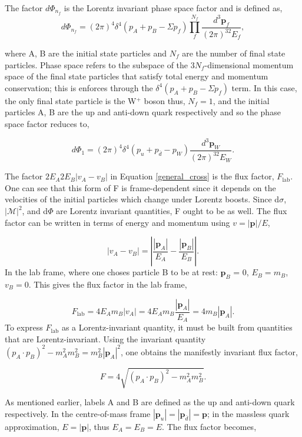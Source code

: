 \documentclass[a4paper,11pt]{article}
\begin{document}
The factor $d\Phi_{n_f}$ is the Lorentz invariant phase space factor and is defined as,
$$d\Phi_{n_f} = (2\pi)^4 \delta^4(p_A +p_B - \Sigma p_f) \prod_{f}^{N_f}\frac{d^3\boldsymbol{p}_f}{(2\pi)^32E_f},$$

where A, B are the initial state particles and $N_f$ are the number of final state particles. Phase space refers to the subspace of the $3N_f$-dimensional momentum space of the final state particles that satisfy total energy and momentum conservation; this is enforces through the $\delta^4(p_A +p_B - \Sigma p_f)$ term. In this case, the only final state particle is the W$^+$ boson thus, $N_f =1$, and the initial particles A, B are the up and anti-down quark respectively and so the phase space factor reduces to,

\begin{equation}\label{LIPS}
	d\Phi_{1} = (2\pi)^4 \delta^4(p_u +p_{\bar{d}} - p_W) \frac{d^3\boldsymbol{p}_W}{(2\pi)^32E_W}.	
\end{equation}


The factor $2E_A 2E_B |v_A - v_B|$ in Equation \ref{general_cross} is the flux factor, $F_{\text{lab}}$. One can see that this form of F is frame-dependent since it depends on the velocities of the initial particles which change under Lorentz boosts. Since d$\sigma$,  $|\mathcal{M}|^2$, and d$\Phi$ are Lorentz invariant quantities, F ought to be as well. The flux factor can be written in terms of energy and momentum using $v = |\boldsymbol{p}|/E$,

$$|v_A-v_B| = \left|\frac{|\boldsymbol{p}_A|}{E_A} - \frac{|\boldsymbol{p}_B|}{E_B}\right|.$$
In the lab frame, where one choses particle B to be at rest: $\boldsymbol{p}_B$ = 0, $E_B = m_B$, $v_B=0$. This gives the flux factor in the lab frame, 

$$ F_{\text{lab}} = 4E_Am_B|v_A| = 4E_Am_B\frac{|\boldsymbol{p}_A|}{E_A} =  4m_B|\boldsymbol{p}_A|.$$
To express $F_{\text{lab}}$ as a Lorentz-invariant quantity, it must be built from quantities that are Lorentz-invariant. Using the invariant quantity $(p_A \cdot p_B)^2 - m_A^2m_B^2 = m_B^2|\boldsymbol{p}_A|^2$, one obtains the manifestly invariant flux factor,

$$F = 4\sqrt{(p_A \cdot p_B)^2 - m_A^2m_B^2 }. $$ 

As mentioned earlier, labels A and B are defined as the up and anti-down quark respectively. In the centre-of-mass frame $|\boldsymbol{p}_u|=|\boldsymbol{p}_{\bar{d}}| = \boldsymbol{p}$; in the massless quark approximation, $E = |\boldsymbol{p}|$, thus $E_A = E_B =E$. The flux factor becomes,
\end{document}
